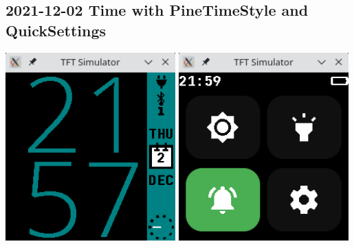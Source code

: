 \documentclass{beamer}
\begin{document}
\subsection{2021-12-02 Time with PineTimeStyle and QuickSettings}
\begin{frame}{}
  \centering\includegraphics[width=0.49\textwidth]{../2021-12-02_PineTimeStyle_notified}
  \centering\includegraphics[width=0.49\textwidth]{../2021-12-02_QuickSettings}
\end{frame}
\end{document}
